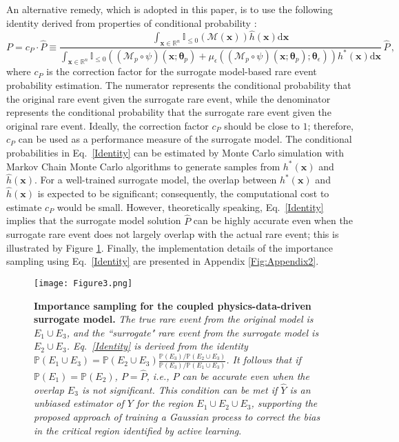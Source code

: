 \documentclass[number,preprint,3p]{elsarticle}
\def\rn{\mathbb{R}^n}
\newcommand{\Prob}[1]{\mathbb{P}\left(#1\right)}
\newcommand{\1}[2]{\mathbb{I}_{#1}\left(#2\right)}
\newcommand{\vect}[1]{\boldsymbol{#1}}
\begin{document}
    An alternative remedy, which is adopted in this paper, is to use the following identity derived from properties of conditional probability \cite{wang2022optimized}:
	\begin{equation}\label{Identity}
		P=c_P\cdot\hat{P}\equiv\frac{\int _{\vect{x}\in\rn}\1{\leq0}{\mathcal{M}(\vect{x})}\hat h(\vect{x})\mathrm{d}\vect{x}}{\int _{\vect{x}\in \rn}\1{\leq0}{(\mathcal{M}_{p}\circ\psi)(\vect{x};\vect{\theta}_{p})+\mu_{{\epsilon}}((\mathcal{M}_{p}\circ\psi)(\vect{x};\vect{\theta}_{p});\vect\theta_\epsilon)}h^{\ast }(\vect{x})\mathrm{d}\vect{x}}\,\hat{P}\,,
	\end{equation}
	where $c_P$ is the correction factor for the surrogate model-based rare event probability estimation. The numerator represents the conditional probability that the original rare event given the surrogate rare event, while the denominator represents the conditional probability that the surrogate rare event given the original rare event. Ideally, the correction factor $c_P$ should be close to $1$; therefore, $c_P$ can be used as a performance measure of the surrogate model. The conditional probabilities in Eq.~\eqref{Identity} can be estimated by Monte Carlo simulation with Markov Chain Monte Carlo algorithms \cite{neal2011mcmc,papaioannou2015mcmc} to generate samples from $h^*(\vect x)$ and $\hat h(\vect x)$. For a well-trained surrogate model, the overlap between $h^*(\vect x)$ and $\hat h(\vect x)$ is expected to be significant; consequently, the computational cost to estimate $c_P$ would be small. However, theoretically speaking, Eq.~\eqref{Identity} implies that the surrogate model solution $\hat P$ can be highly accurate even when the surrogate rare event does not largely overlap with the actual rare event; this is illustrated by Figure \ref{Fig:Figure3}. Finally, the implementation details of the importance sampling using Eq.~\eqref{Identity} are presented in Appendix \ref{Fig:Appendix2}. 
		
	\begin{figure}[H]
		\centering
		\texttt{[image: Figure3.png]}
		\caption{\textbf{Importance sampling for the coupled physics-data-driven surrogate model.} \textit{The true rare event from the original model is $E_1\cup E_3$, and the ``surrogate" rare event from the surrogate model is $E_2\cup E_3$. Eq.~\eqref{Identity} is derived from the identity $\Prob{E_1\cup E_3}=\Prob{E_2\cup E_3}\frac{\Prob{E_3}/{\Prob{E_2\cup E_3}}}{\Prob{E_3}/{\Prob{E_1\cup E_3}}}$. It follows that if $\Prob{E_1}=\Prob{E_2}$, $P=\hat P$, i.e., $\hat P$ can be accurate even when the overlap $E_3$ is not significant. This condition can be met if $\hat Y$ is an unbiased estimator of $Y$ for the region $E_1\cup E_2\cup E_3$, supporting the proposed approach of training a Gaussian process to correct the bias in the critical region identified by active learning}.}
		\label{Fig:Figure3}
	\end{figure}
	
\end{document}
